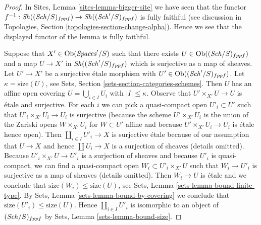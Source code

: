 \begin{proof}

In Sites, Lemma \ref{sites-lemma-bigger-site} we have seen that the functor
$f^{-1} : \mathit{Sh}((\mathit{Sch}/S)_{fppf}) \to \mathit{Sh}((\mathit{Sch}'/S)_{fppf})$
is fully faithful (see discussion in
Topologies, Section \ref{topologies-section-change-alpha}).
Hence we see that the displayed functor of the lemma is fully faithful.

\medskip\noindent
Suppose that $X' \in \operatorname{Ob}(\textit{Spaces}'/S)$ such that there exists
$U \in \operatorname{Ob}((\mathit{Sch}/S)_{fppf})$ and a map $U \to X'$ in
$\mathit{Sh}((\mathit{Sch}'/S)_{fppf})$ which is surjective as a map of sheaves.
Let $U' \to X'$ be a surjective \'etale morphism with
$U' \in \operatorname{Ob}((\mathit{Sch}'/S)_{fppf})$. Let $\kappa = \text{size}(U)$, see
Sets, Section \ref{sets-section-categories-schemes}.
Then $U$ has an affine open covering $U = \bigcup_{i \in I} U_i$
with $|I| \leq \kappa$. Observe that $U' \times_{X'} U \to U$ is \'etale
and surjective. For each $i$ we can pick a quasi-compact
open $U'_i \subset U'$ such that $U'_i \times_{X'} U_i \to U_i$
is surjective (because the scheme $U' \times_{X'} U_i$ is the
union of the Zariski opens $W \times_{X'} U_i$ for $W \subset U'$
affine and because $U' \times_{X'} U_i \to U_i$ is \'etale hence open).
Then $\coprod_{i \in I} U'_i \to X$ is surjective \'etale
because of our assumption that $U \to X$ and hence $\coprod U_i \to X$
is a surjection of sheaves (details omitted).
Because $U'_i \times_{X'} U \to U'_i$ is a surjection of sheaves
and because $U'_i$ is quasi-compact,
we can find a quasi-compact open $W_i \subset U'_i \times_{X'} U$
such that $W_i \to U'_i$ is surjective as a map of sheaves
(details omitted). Then $W_i \to U$ is \'etale and we conclude
that $\text{size}(W_i) \leq \text{size}(U)$, see
Sets, Lemma \ref{sets-lemma-bound-finite-type}. By
Sets, Lemma \ref{sets-lemma-bound-by-covering} we conclude
that $\text{size}(U'_i) \leq \text{size}(U)$.
Hence $\coprod_{i \in I} U'_i$ is isomorphic to an object of
$(\mathit{Sch}/S)_{fppf}$ by Sets, Lemma \ref{sets-lemma-bound-size}.


\end{proof}
